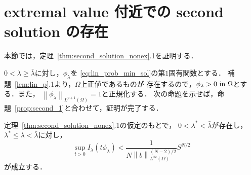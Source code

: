  \section{extremal value 付近での second solution の存在} \label{sec:exist}
 
 本節では，定理~\ref{thm:second_solution_nonex}.1を証明する．
 
 $0 < \lambda \geq \bar{\lambda}$に対し，$\phi_\lambda$を
 \eqref{eq:lin_prob_min_sol}の第$1$固有関数とする．
 補題~\ref{lem:lin_p}.1より，$\Omega$上正値であるものが
 存在するので，$\phi_\lambda > 0 ~\text{in}~ \Omega$とする．また，
 $\left\| \phi_\lambda \right\|_{L^{p+1}(\Omega)} = 1$と正規化する．
 次の命題を示せば，命題~\ref{prop:second_1}と合わせて，証明が完了する．
 
\begin{prop} \label{prop:exist}
 定理~\ref{thm:second_solution_nonex}.1の仮定のもとで，
 $0 < \lambda^* < \bar{\lambda}$が存在し，
 $\lambda^* \leq \lambda < \bar{\lambda}$に対し，
 \begin{equation}
  \sup_{t > 0} I_\lambda(t \phi_\lambda) < \frac{1}{N \left\| b
                                                                                            \right\|_{L^\infty(\Omega)}^{(N-2)/2}}
  S^{N/2} \label{eq:exist_S}
 \end{equation}
 が成立する．
\end{prop}

